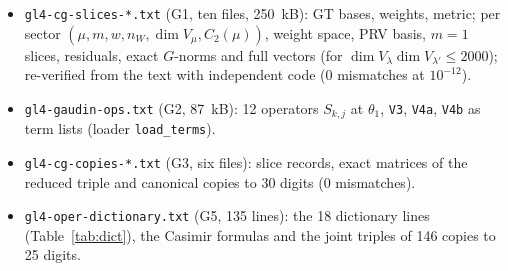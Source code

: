 \documentclass[11pt]{article}
\begin{document}
\begin{itemize}\small\raggedright
\item \texttt{gl4-cg-slices-*.txt} (G1, ten files, 250~kB): GT bases, weights, metric; per sector $(\mu,m,w,n_W,\dim V_\mu,C_2(\mu))$, weight space, PRV basis, $m=1$ slices, residuals, exact $G$-norms and full vectors (for $\dim V_\lambda\dim V_{\lambda'}\le2000$); re-verified from the text with independent code (0 mismatches at $10^{-12}$).
\item \texttt{gl4-gaudin-ops.txt} (G2, 87~kB): 12 operators $S_{k,j}$ at $\theta_1$, \texttt{V3}, \texttt{V4a}, \texttt{V4b} as term lists (loader \texttt{load\_terms}).
\item \texttt{gl4-cg-copies-*.txt} (G3, six files): slice records, exact matrices of the reduced triple and canonical copies to 30 digits (0 mismatches).
\item \texttt{gl4-oper-dictionary.txt} (G5, 135 lines): the 18 dictionary lines (Table~\ref{tab:dict}), the Casimir formulas and the joint triples of 146 copies to 25 digits.
\end{itemize}
\end{document}
